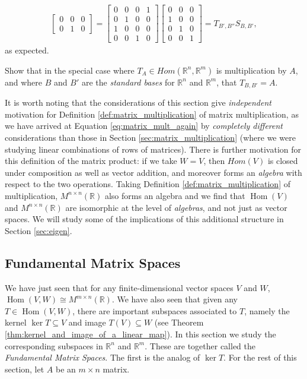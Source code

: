 \documentclass[12pt,letterpaper,reqno]{article}
\numberwithin{equation}{section}
\newcommand{\R}{\ensuremath{\mathbb R}}
\DeclareMathOperator{\Hom}{Hom}
\newcommand{\fixme}[1]{{\color{orange}{[#1]}}}
\begin{document}
\begin{example}
\begin{align*}
\begin{bmatrix}
		0 & 0 & 0 \\
		0 & 1 & 0
	\end{bmatrix}=\begin{bmatrix}
		0 & 0 & 0 & 1 \\
		0 & 1 & 0 & 0 \\
		1 & 0 & 0 & 0 \\
		0 & 0 & 1 & 0
	\end{bmatrix}\begin{bmatrix}
		0 & 0 & 0 \\
		1 & 0 & 0 \\
		0 & 1 & 0 \\
		0 & 0 & 1
	\end{bmatrix}=T_{B',B''}S_{B,B'},
\end{align*}
as expected.
\end{example}

\begin{exercise}
Show that in the special case where $T_A \in Hom(\mathbb{R}^n,\mathbb{R}^m)$ is multiplication by $A$, and where $B$ and $B'$ are the \emph{standard bases} for $\mathbb{R}^n$ and $\mathbb{R}^m$, that $T_{B,B'}=A$.	
\end{exercise}

\fixme{Add solution.}

It is worth noting that the considerations of this section give \emph{independent} motivation for Definition \ref{def:matrix_multiplication} of matrix multiplication, as we have arrived at Equation \ref{eq:matrix_mult_again} by \emph{completely different} considerations than those in Section \ref{sec:matrix_multiplication} (where we were studying linear combinations of rows of matrices). There is further motivation for this definition of the matrix product: if we take $W=V$, then $Hom(V)$ is closed under composition as well as vector addition, and moreover forms an \emph{algebra} with respect to the two operations. Taking Definition \ref{def:matrix_multiplication} of multiplication, $M^{n \times n}(\R)$ also forms an algebra and we find that $\Hom(V)$ and $M^{n \times n}(\R)$ are isomorphic at the level of \emph{algebras}, and not just as vector spaces. We will study some of the implications of this additional structure in Section \ref{sec:eigen}.

\subsection{Fundamental Matrix Spaces}
We have just seen that for any finite-dimensional vector spaces $V$ and $W$, $\Hom(V,W)\cong M^{m \times n}(\R)$. We have also seen that given any $T \in \Hom(V,W)$, there are important subspaces associated to $T$, namely the kernel $\ker T \subseteq V$ and image $T(V) \subseteq W$ (see Theorem \ref{thm:kernel_and_image_of_a_linear_map}).  In this section we study the corresponding subspaces in $\R^n$ and $\R^m$. These are together called the \emph{Fundamental Matrix Spaces}. The first is the analog of $\ker T$. For the rest of this section, let $A$ be an $m \times n$ matrix. 
\end{document}
